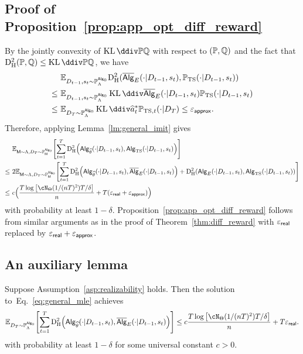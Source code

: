 \subsection{Proof of Proposition~\ref{prop:app_opt_diff_reward}}\label{app:proof-prop-diff-reward-app-opt}

By the jointly convexity of $\KL{\P}{\Q}$ with respect to $(\mathbb{P},\mathbb{Q})$ and the fact that $\HelDs(\P,\Q)\leq\KL{\P}{\Q}$, we have 
\begin{align*}
  &~\E_{\dset_{t-1},\state_t\sim\P_\prior^{\sAlg_0}}\HelDs(\osAlg_{\shortexp}(\cdot|\dset_{t-1},\state_t),\P_{\TS}(\cdot|\dset_{t-1},\state_t))\\
  \leq &~
  \E_{\dset_{t-1},\state_t\sim\P_\prior^{\sAlg_0}}\KL{\osAlg_{\shortexp}(\cdot|\dset_{t-1},\state_t)}{\P_{\TS}(\cdot|\dset_{t-1},\state_t)}\\
   \leq &~
 \E_{\dset_\totlen\sim\P_{\prior}^{\sAlg_0}}\KL{\widehat\action^*_t}{\P_{\TS,t}(\cdot|\dset_\totlen)}\leq\appeps.
\end{align*} Therefore, applying Lemma~\ref{lm:general_imit} gives
 \begin{align*}
        &~\E_{\inst\sim \prior, \dset_\totlen\sim \P^{\sAlg_0}_\inst}\brac{ \sum_{t=1}^\totlen \HelDs\paren{ \sAlg_{{\EstPar}}(\cdot|\dset_{t-1},\state_t ), \sAlg_{\TS}(\cdot|\dset_{t-1},\state_t )} }\\
        \le&~
        2\E_{\inst\sim \prior, \dset_\totlen\sim \P^{\sAlg_0}_\inst}\brac{ \sum_{t=1}^\totlen \HelDs\paren{ \sAlg_{{\EstPar}}(\cdot|\dset_{t-1},\state_t ), \osAlg_{\shortexp}(\cdot|\dset_{t-1},\state_t )}+\HelDs\paren{ \sAlg_{{\shortexp}}(\cdot|\dset_{t-1},\state_t ), \sAlg_{\TS}(\cdot|\dset_{t-1},\state_t )} }\\
       \le&~
       c\Big(\frac{\totlen \log \brac{ \cN_{\Parspace}(1/(\Numobs\totlen)^2) \totlen/\delta } }{n} + \totlen(\geneps+\appeps)\Big)
    \end{align*} 
    with probability at least $1-\delta$. Proposition~\ref{prop:app_opt_diff_reward} follows from similar arguments as in the proof of Theorem~\ref{thm:diff_reward} with ${\varepsilon}_{\sf real}$ replaced by ${\varepsilon}_{\sf real}+\varepsilon_{{\mathsf{approx}}}$. 

\subsection{An auxiliary lemma}

\begin{lemma}\label{lm:general_imit}
Suppose Assumption~\ref{asp:realizability} holds. Then  the solution to~Eq.~\eqref{eq:general_mle} achieves
\begin{align*}
\E_{\dset_\totlen\sim \P^{\sAlg_0}_\prior}\brac{ \sum_{t=1}^\totlen \HelDs\paren{ \sAlg_{{\EstPar}}(\cdot|\dset_{t-1},\state_t ), \osAlg_{\shortexp}(\cdot|\dset_{t-1},\state_t )} } \le c\frac{\totlen \log \brac{ \cN_{\Parspace}(1/(\Numobs\totlen)^2) \totlen/\delta } }{n} + \totlen\geneps.
\end{align*}
with probability at least $1-\delta$ for some universal constant $c>0$.
\end{lemma}



